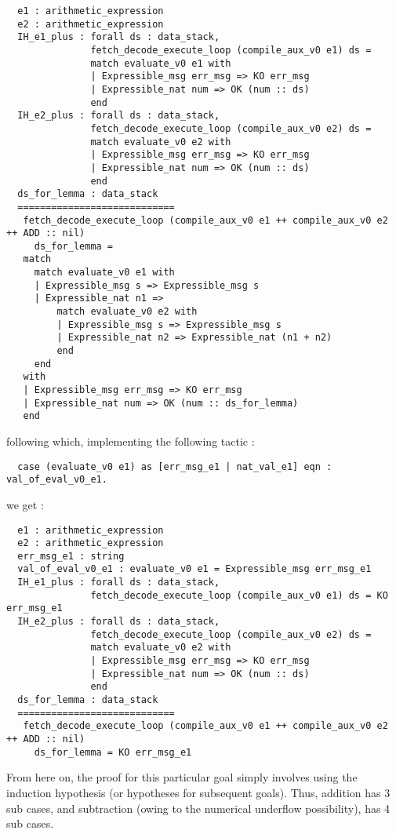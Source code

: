 \documentclass[12pt, a4paper]{article}
\begin{document}
\begin{lstlisting}
  e1 : arithmetic_expression
  e2 : arithmetic_expression
  IH_e1_plus : forall ds : data_stack,
               fetch_decode_execute_loop (compile_aux_v0 e1) ds =
               match evaluate_v0 e1 with
               | Expressible_msg err_msg => KO err_msg
               | Expressible_nat num => OK (num :: ds)
               end
  IH_e2_plus : forall ds : data_stack,
               fetch_decode_execute_loop (compile_aux_v0 e2) ds =
               match evaluate_v0 e2 with
               | Expressible_msg err_msg => KO err_msg
               | Expressible_nat num => OK (num :: ds)
               end
  ds_for_lemma : data_stack
  ============================
   fetch_decode_execute_loop (compile_aux_v0 e1 ++ compile_aux_v0 e2 ++ ADD :: nil)
     ds_for_lemma =
   match
     match evaluate_v0 e1 with
     | Expressible_msg s => Expressible_msg s
     | Expressible_nat n1 =>
         match evaluate_v0 e2 with
         | Expressible_msg s => Expressible_msg s
         | Expressible_nat n2 => Expressible_nat (n1 + n2)
         end
     end
   with
   | Expressible_msg err_msg => KO err_msg
   | Expressible_nat num => OK (num :: ds_for_lemma)
   end
\end{lstlisting}

following which, implementing the following tactic :

\begin{lstlisting}
  case (evaluate_v0 e1) as [err_msg_e1 | nat_val_e1] eqn : val_of_eval_v0_e1.
\end{lstlisting}

we get :

\begin{lstlisting}
  e1 : arithmetic_expression
  e2 : arithmetic_expression
  err_msg_e1 : string
  val_of_eval_v0_e1 : evaluate_v0 e1 = Expressible_msg err_msg_e1
  IH_e1_plus : forall ds : data_stack,
               fetch_decode_execute_loop (compile_aux_v0 e1) ds = KO err_msg_e1
  IH_e2_plus : forall ds : data_stack,
               fetch_decode_execute_loop (compile_aux_v0 e2) ds =
               match evaluate_v0 e2 with
               | Expressible_msg err_msg => KO err_msg
               | Expressible_nat num => OK (num :: ds)
               end
  ds_for_lemma : data_stack
  ============================
   fetch_decode_execute_loop (compile_aux_v0 e1 ++ compile_aux_v0 e2 ++ ADD :: nil)
     ds_for_lemma = KO err_msg_e1
\end{lstlisting}

From here on, the proof for this particular goal simply involves using the induction
hypothesis (or hypotheses for subsequent goals). Thus, addition has 3 sub cases, 
and subtraction (owing to the numerical underflow possibility), has 4 sub cases. 
\end{document}
